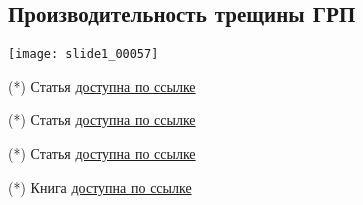 \documentclass[main.tex]{subfiles}
\begin{document}
\subsection{Производительность трещины ГРП}

\texttt{[image: slide1\_00057]}


(*) Статья \href{https://mualal.github.io/source/tex/hydrocarbons2022/articles/gringarten1974.pdf}{доступна по ссылке}


(*) Статья \href{https://mualal.github.io/source/tex/hydrocarbons2022/articles/gringarten1974.pdf}{доступна по ссылке}


(*) Статья \href{https://mualal.github.io/source/tex/hydrocarbons2022/articles/gringarten1974.pdf}{доступна по ссылке}


(*) Книга \href{https://mualal.github.io/source/tex/hydrocarbons2022/articles/economides_fracture_design.pdf}{доступна по ссылке}






\end{document}

